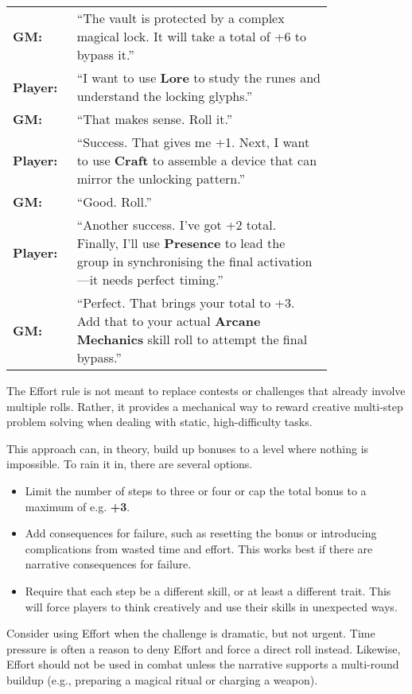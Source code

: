 \begin{WyrdExample}
    \begin{tabular}{@{}l p{0.8\linewidth}@{}}
        \textbf{GM:} & “The vault is protected by a complex magical lock. It will take a total of +6 to bypass it.” \\
        \textbf{Player:} & “I want to use \textbf{Lore} to study the runes and understand the locking glyphs.” \\
        \textbf{GM:} & “That makes sense. Roll it.” \\
        \textbf{Player:} & “Success. That gives me +1. Next, I want to use \textbf{Craft} to assemble a device that can mirror the unlocking pattern.” \\
        \textbf{GM:} & “Good. Roll.” \\
        \textbf{Player:} & “Another success. I’ve got +2 total. Finally, I’ll use \textbf{Presence} to lead the group in synchronising the final activation—it needs perfect timing.” \\
        \textbf{GM:} & “Perfect. That brings your total to +3. Add that to your actual \textbf{Arcane Mechanics} skill roll to attempt the final bypass.”
    \end{tabular}
\end{WyrdExample}

The Effort rule is not meant to replace contests or challenges that already involve multiple rolls. Rather, it provides a mechanical way to reward creative multi-step problem solving when dealing with static, high-difficulty tasks.

\begin{WyrdGmTips}
    This approach can, in theory, build up bonuses to a level where nothing is impossible. To rain it in, there are several options.
    \begin{itemize}
        \item Limit the number of steps to three or four or cap the total bonus to a maximum of e.g. \textbf{+3}.
        \item Add consequences for failure, such as resetting the bonus or introducing complications from wasted time and effort. This works best if there are narrative consequences for failure.
        \item Require that each step be a different skill, or at least a different trait. This will force players to think creatively and use their skills in unexpected ways.
    \end{itemize}

    Consider using Effort when the challenge is dramatic, but not urgent. Time pressure is often a reason to deny Effort and force a direct roll instead. Likewise, Effort should not be used in combat unless the narrative supports a multi-round buildup (e.g., preparing a magical ritual or charging a weapon).
\end{WyrdGmTips}

